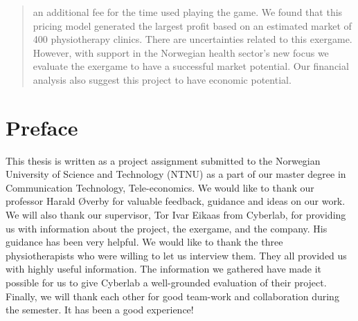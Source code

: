 \documentclass[b5paper,twoside,openright,11pt]{report}
\begin{document}
\begin{abstract}
an additional fee for the time used playing the game. We found that this pricing model generated the largest profit based on an estimated market of 400 physiotherapy clinics. There are uncertainties related to this exergame. However, with support in the Norwegian health sector's new focus we evaluate the exergame to have a successful market potential. Our financial analysis also suggest this project to have economic potential. 
\end{abstract}
\cleardoublepage
\chapter*{Preface}
This thesis is written as a project assignment submitted to the Norwegian University of Science and Technology (NTNU) as a part of our master degree in Communication Technology, Tele-economics. 
We would like to thank our professor Harald Øverby for valuable feedback, guidance and ideas on our work. We will also thank our supervisor, Tor Ivar Eikaas from Cyberlab, for providing us with information about the project, the exergame, and the company. His guidance has been very helpful. We would like to thank the three physiotherapists who were willing to let us interview them. They all provided us with highly useful information. The information we gathered have made it possible for us to give Cyberlab a well-grounded evaluation of their project.  
Finally, we will thank each other for good team-work and collaboration during the semester. It has been a good experience! 

\cleardoublepage
{}
\tableofcontents
\cleardoublepage

\cleardoublepage
\listoffigures
\cleardoublepage
\listoftables
\cleardoublepage
{}
\pagestyle{fancy}
\fancyhead[LE]{\thepage}
\fancyhead[RE]{\leftmark}
\fancyhead[RO]{\thepage}
\fancyhead[LO]{\rightmark}
\fancyfoot{}

\cleardoublepage

\cleardoublepage

\cleardoublepage

\cleardoublepage

\cleardoublepage

\cleardoublepage

\cleardoublepage

\cleardoublepage

\cleardoublepage

\cleardoublepage


\cleardoublepage

\end{document}
